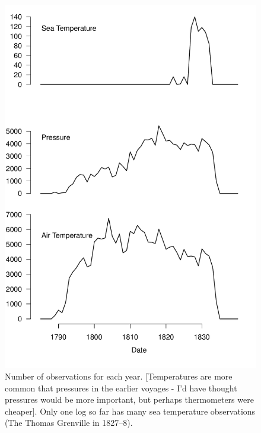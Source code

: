 \documentclass[a4paper,11pt]{article}
\begin{document}
\begin{figure}
\begin{center}
\includegraphics[angle=0, width=1.0\textwidth]{../obs_count/ob_years}
\caption{Number of observations for each year. [Temperatures are more common that pressures in the earlier voyages - I'd have thought pressures would be more important, but perhaps thermometers were cheaper]. Only one log so far has many sea temperature observations (The Thomas Grenville in 1827--8).}
\label{ob_months}
\end{center}
\end{figure}
\end{document}
